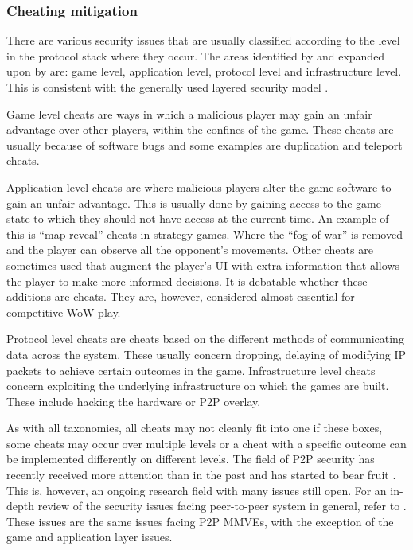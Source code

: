 \subsubsection{Cheating mitigation}
\label{key_challenges_cheating}

There are various security issues that are usually classified according to the level in the protocol stack where they occur. The areas identified by \cite{cheat_proof_event_ordering} and expanded upon by \cite{cheating_taxonomy} are: game level, application level, protocol level and infrastructure level. This is consistent with the generally used layered security model \cite{distributed_systems_security}.

Game level cheats are ways in which a malicious player may gain an unfair advantage over other players, within the confines of the game. These cheats are usually because of software bugs and some examples are duplication and teleport cheats.

Application level cheats are where malicious players alter the game software to gain an unfair advantage. This is usually done by gaining access to the game state to which they should not have access at the current time. An example of this is ``map reveal'' cheats in strategy games. Where the ``fog of war'' is removed and the player can observe all the opponent's movements. Other cheats are sometimes used that augment the player's UI with extra information that allows the player to make more informed decisions. It is debatable whether these additions are cheats. They are, however, considered almost essential for competitive WoW play.

Protocol level cheats are cheats based on the different methods of communicating data across the system. These usually concern dropping, delaying of modifying IP packets to achieve certain outcomes in the game. Infrastructure level cheats concern exploiting the underlying infrastructure on which the games are built. These include hacking the hardware or P2P overlay.

As with all taxonomies, all cheats may not cleanly fit into one if these boxes, some cheats may occur over multiple levels or a cheat with a specific outcome can be implemented differently on different levels. The field of P2P security has recently received more attention than in the past and has started to bear fruit \cite{survey_p2p_game_cheats}. This is, however, an ongoing research field with many issues still open. For an in-depth review of the security issues facing peer-to-peer system in general, refer to \cite{p2p_security_issues}. These issues are the same issues facing P2P MMVEs, with the exception of the game and application layer issues.


